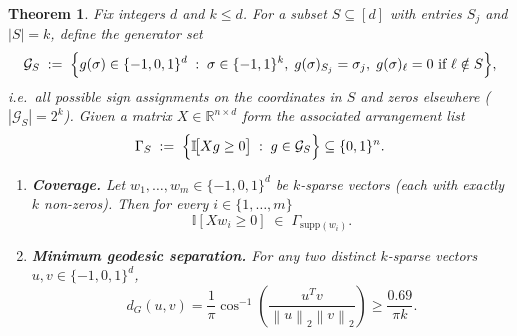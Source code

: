 \documentclass[10pt,a4paper]{amsart}
\newtheorem{theorem}{Theorem}
\newcommand{\twonorm}[1]{\left\|#1\right\|_{2}}
\begin{document}
\begin{theorem}
Fix integers \(d\) and \(k\le d\).
For a subset $S \subseteq [d]$ with entries $S_j$ and $|S| = k$, define the
\emph{generator set}
\[
\mathcal G_{S}
\;:=\;
\Bigl\{
      g(\sigma)\in\{-1,0,1\}^{d}\;:\;
      \sigma\in\{-1,1\}^{k},
      \;g(\sigma)_{S_{j}}=\sigma_{j},\;
      g(\sigma)_{\ell}=0\text{ if }\ell\notin S
\Bigr\},
\]
i.e.\ all possible sign assignments on the coordinates in \(S\) and zeros elsewhere
(\(|\mathcal G_{S}|=2^{k}\)).
Given a matrix \(X\in\mathbb{R}^{n\times d}\) form the associated
\emph{arrangement list}
\[
\Gamma_{S}
\;:=\;
\Bigl\{
      \mathbb I\!\bigl[Xg\ge 0\bigr]\;:\;g\in\mathcal G_{S}
\Bigr\}
\subseteq\{0,1\}^{n}.
\]

\begin{enumerate}
\item[\textup{(i)}] \textbf{Coverage.}\;
      Let \(w_{1},\dots ,w_{m}\in\{-1,0,1\}^{d}\) be
      \(k\)-sparse vectors (each with exactly \(k\) non-zeros).
      Then for every \(i\in\{1,\dots ,m\}\)
      \[
        \mathbb I[Xw_{i}\ge 0]\;\in\;\Gamma_{\text{supp}(w_{i})}.
      \]

\item[\textup{(ii)}] \textbf{Minimum geodesic separation.}\;
      For any two distinct \(k\)-sparse vectors
      \(u,v\in\{-1,0,1\}^{d}\),
      \[
        d_G(u, v) = \frac{1}{\pi}\cos^{-1}\left(\frac{u^Tv}{\twonorm{u}\twonorm{v}} \right) \geq \frac{0.69}{\pi k}.
      \]
\end{enumerate}
\end{theorem}
\end{document}
